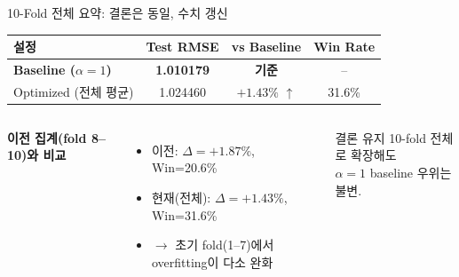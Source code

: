 \documentclass[aspectratio=169,10pt]{beamer}
\begin{document}
\begin{frame}{10-Fold 전체 요약: 결론은 동일, 수치 갱신}
	\begin{center}
	\renewcommand{\arraystretch}{1.35}
	\begin{tabular}{l|c|c|c}
		\toprule
		\textbf{설정} & \textbf{Test RMSE} & \textbf{vs Baseline} & \textbf{Win Rate} \\
		\midrule
		\rowcolor{testgreen!20}
		\textbf{Baseline (\(\alpha=1\))} & \textbf{1.010179} & \textbf{기준} & -- \\
		Optimized (전체 평균) & 1.024460 & $+1.43\%$ \textcolor{negred}{$\uparrow$} & 31.6\% \\
		\bottomrule
	\end{tabular}
	\end{center}

	\vspace{0.4em}
	\begin{columns}[T]
			\textbf{이전 집계(fold 8--10)와 비교}
			\begin{itemize}
				\item 이전: $\Delta=+1.87\%$, Win=20.6\%
				\item 현재(전체): $\Delta=+1.43\%$, Win=31.6\%
				\item \(\to\) 초기 fold(1--7)에서 overfitting이 다소 완화
			\end{itemize}
			\begin{alertblock}{결론 유지}
				10-fold 전체로 확장해도\\
				\(\alpha=1\) baseline 우위는 불변.
			\end{alertblock}
	\end{columns}
\end{frame}
\end{document}
